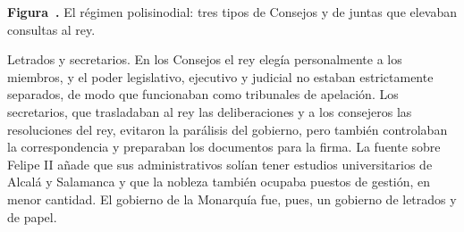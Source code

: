 \documentclass{book}
\newcounter{studiumfigure}
\begin{document}
\begin{minipage}{\linewidth}
%
\fi
\fi
\endgroup
\par\nopagebreak
{\small {}\label{fig:sistema-consejos}\textbf{Figura~\thestudiumfigure.} El régimen polisinodial: tres tipos de Consejos y de juntas que elevaban consultas al rey.\par}
\end{minipage}
\par\vspace{\baselineskip}

Letrados y secretarios. En los Consejos el rey elegía personalmente a los miembros, y el poder legislativo, ejecutivo y judicial no estaban estrictamente separados, de modo que funcionaban como tribunales de apelación. Los secretarios, que trasladaban al rey las deliberaciones y a los consejeros las resoluciones del rey, evitaron la parálisis del gobierno, pero también controlaban la correspondencia y preparaban los documentos para la firma. La fuente sobre Felipe II añade que sus administrativos solían tener estudios universitarios de Alcalá y Salamanca y que la nobleza también ocupaba puestos de gestión, en menor cantidad. El gobierno de la Monarquía fue, pues, un gobierno de letrados y de papel.
\end{document}
